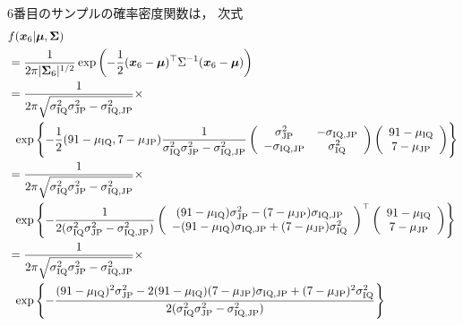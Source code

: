 \documentclass[a4j]{jarticle}\usepackage[]{graphicx}\usepackage[]{color}
\begin{document}
6番目のサンプルの確率密度関数は，
次式
\begin{align}
&f(\vec{x}_{6} | \vec{\mu}, \vec{\Sigma})  \nonumber \\
  &= \frac{1}{2\pi |\vec{\Sigma}_{6}|^{1/2}} 
       \exp{
         \left(
           -\frac{1}{2}
             \transpose{
               (\vec{x}_{6} - \vec{\mu})
             }
             \Sigma^{-1}
             (\vec{x}_{6} - \vec{\mu})
         \right)
       } \\
  &= \frac{1}{2\pi\sqrt{\sigma_{\IQ}^2 \sigma_{\JP}^2 - \sigma_{\IQ, \JP}^2}} \times \nonumber \\
  & \, \, \,
       \exp{
         \left\{
           -\frac{1}{2} 
             (91 - \mu_{\IQ}, 7 - \mu_{\JP}) 
             \frac{1}{\sigma_{\IQ}^2 \sigma_{\JP}^2 - \sigma_{\IQ, \JP}^2} 
             \left(
               \begin{array}{cc}
                 \sigma_{\JP}^2 & -\sigma_{\IQ, \JP} \\
                 -\sigma_{\IQ, \JP} & \sigma_{\IQ}^2
               \end{array}
             \right)
             \left(
               \begin{array}{c}
                 91 - \mu_{\IQ} \\
                 7 - \mu_{\JP}
               \end{array}
             \right)
         \right\}
       } \\
  &= \frac{1}{2\pi\sqrt{\sigma_{\IQ}^2 \sigma_{\JP}^2 - \sigma_{\IQ, \JP}^2}} \times \nonumber \\
  & \, \, \,
       \exp{
         \left\{
           -\frac{1}{2(\sigma_{\IQ}^2 \sigma_{\JP}^2 - \sigma_{\IQ, \JP}^2)}
             \transpose{
               \left(
                 \begin{array}{c}
                 (91-\mu_{\IQ}) \sigma_{\JP}^2 - (7-\mu_{\JP}) \sigma_{\IQ, \JP} \\
                 -(91-\mu_{\IQ}) \sigma_{\IQ, \JP} + (7-\mu_{\JP}) \sigma_{\IQ}^2
                 \end{array}
               \right)
             }
             \left(
               \begin{array}{c}
                 91 - \mu_{\IQ} \\
                 7 - \mu_{\JP}
               \end{array}
             \right)
         \right\}
       } \\
  &= \frac{1}{2\pi\sqrt{\sigma_{\IQ}^2 \sigma_{\JP}^2 - \sigma_{\IQ, \JP}^2}} \times \nonumber \\
  & \, \, \,
       \exp{
         \left\{
           -\frac{(91-\mu_{\IQ})^2\sigma_{\JP}^2 - 2(91-\mu_{\IQ})(7-\mu_{\JP})\sigma_{\IQ, \JP} + (7 - \mu_{\JP})^2 \sigma_{\IQ}^2}{2(\sigma_{\IQ}^2 \sigma_{\JP}^2 - \sigma_{\IQ, \JP}^2)}
         \right\}
       }
\end{align}
\end{document}

